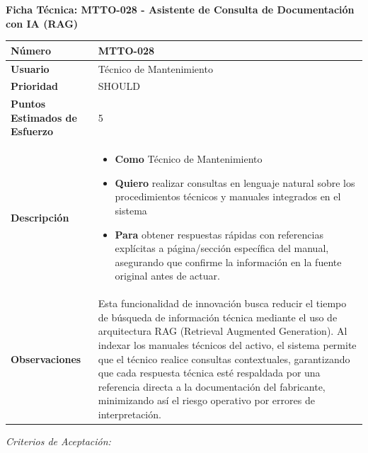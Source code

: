 \vspace{1em}
\noindent\textbf{Ficha Técnica: MTTO-028 - Asistente de Consulta de Documentación con IA (RAG)}
\footnotesize\setlength{\tabcolsep}{4pt}\renewcommand{\arraystretch}{1.2}
\begin{longtable}{|p{0.21\textwidth}|p{0.74\textwidth}|}\hline
\textbf{Número} & MTTO-028 \\ \hline
\textbf{Usuario} & Técnico de Mantenimiento \\ \hline
\textbf{Prioridad} & SHOULD \\ \hline
\textbf{Puntos Estimados de Esfuerzo} & 5 \\ \hline
\textbf{Descripción} & \parbox[t]{\linewidth}{\vspace{2pt}\begin{itemize}[leftmargin=1.5em, nosep, topsep=0pt]
\item \textbf{Como} Técnico de Mantenimiento
\item \textbf{Quiero} realizar consultas en lenguaje natural sobre los procedimientos técnicos y manuales integrados en el sistema
\item \textbf{Para} obtener respuestas rápidas con referencias explícitas a página/sección específica del manual, asegurando que confirme la información en la fuente original antes de actuar.
\end{itemize}\vspace{2pt}} \\ \hline
\textbf{Observaciones} & Esta funcionalidad de innovación busca reducir el tiempo de búsqueda de información técnica mediante el uso de arquitectura RAG (Retrieval Augmented Generation). Al indexar los manuales técnicos del activo, el sistema permite que el técnico realice consultas contextuales, garantizando que cada respuesta técnica esté respaldada por una referencia directa a la documentación del fabricante, minimizando así el riesgo operativo por errores de interpretación. \\ \hline
\end{longtable}\normalsize
\noindent\textit{Criterios de Aceptación:}
